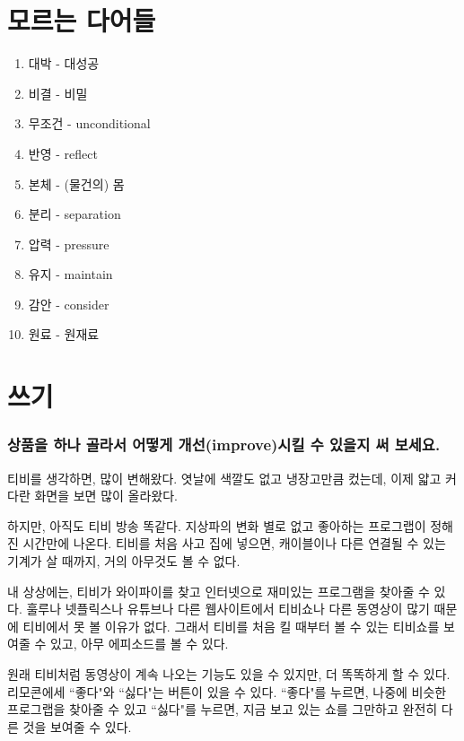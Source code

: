 \documentclass[11pt]{article}
\begin{document}
\section{모르는 다어들}
\begin{enumerate}
  \item 대박 - 대성공
  \item 비결 - 비밀
  \item 무조건 - unconditional
  \item 반영 - reflect
  \item 본체 - (물건의) 몸
  \item 분리 - separation
  \item 압력 - pressure
  \item 유지 - maintain
  \item 감안 - consider
  \item 원료 - 원재료
\end{enumerate}
\section{쓰기}
\doublespacing
\subsubsection*{상품을 하나 골라서 어떻게 개선(improve)시킬 수 있을지 써 보세요.}

티비를 생각하면, 많이 변해왔다. 엿날에 색깔도 없고 냉장고만큼 컸는데, 이제 얇고 커다란 화면을 보면 많이 올라왔다.

하지만, 아직도 티비 방송 똑같다. 지상파의 변화 별로 없고 좋아하는 프로그랩이 정해진 시간만에 나온다. 티비를 처음 사고 집에 넣으면, 캐이블이나 다른 연결될 수 있는 기계가 살 때까지, 거의 아무것도 볼 수 없다.

내 상상에는, 티비가 와이파이를 찾고 인터넷으로 재미있는 프로그램을 찾아줄 수 있다. 훌루나 넷플릭스나 유튜브나 다른 웹사이트에서 티비쇼나 다른 동영상이 많기 때문에 티비에서 못 볼 이유가 없다.  그래서 티비를 처음 킬 때부터 볼 수 있는 티비쇼를 보여줄 수 있고, 아무 에피소드를 볼 수 있다.

원래 티비처럼 동영상이 계속 나오는 기능도 있을 수 있지만, 더 똑똑하게 할 수 있다.  리모콘에세 ``좋다"와 ``싫다"는 버튼이 있을 수 있다.  ``좋다"를 누르면, 나중에 비슷한 프로그랩을 찾아줄 수 있고 ``싫다"를 누르면, 지금 보고 있는 쇼를 그만하고 완전히 다른 것을 보여줄 수 있다.
\end{document}
